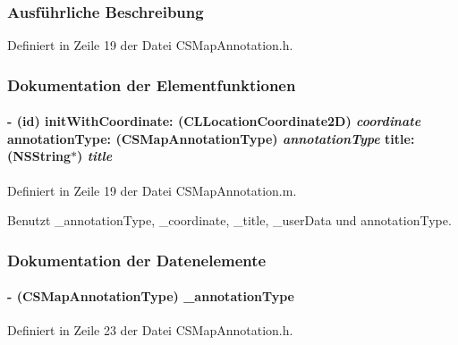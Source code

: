 \subsubsection{Ausführliche Beschreibung}


Definiert in Zeile 19 der Datei CSMapAnnotation.h.

\subsubsection{Dokumentation der Elementfunktionen}
\hypertarget{interface_c_s_map_annotation_a59239c83c34dd66add7bbc27492d636c}{
\paragraph[{initWithCoordinate:annotationType:title:}]{\setlength{\rightskip}{0pt plus 5cm}-\/ (id) initWithCoordinate: (CLLocationCoordinate2D) {\em coordinate}\/ annotationType: ({\bf CSMapAnnotationType}) {\em annotationType}\/ title: (NSString$\ast$) {\em title}}\hfill}
\label{interface_c_s_map_annotation_a59239c83c34dd66add7bbc27492d636c}


Definiert in Zeile 19 der Datei CSMapAnnotation.m.

Benutzt \_\-annotationType, \_\-coordinate, \_\-title, \_\-userData und annotationType.

\subsubsection{Dokumentation der Datenelemente}
\hypertarget{interface_c_s_map_annotation_a6c62bc91ec129a0eccdd33b67132a6ba}{
\paragraph[{\_\-annotationType}]{\setlength{\rightskip}{0pt plus 5cm}-\/ ({\bf CSMapAnnotationType}) {\bf \_\-annotationType}}\hfill}
\label{interface_c_s_map_annotation_a6c62bc91ec129a0eccdd33b67132a6ba}


Definiert in Zeile 23 der Datei CSMapAnnotation.h.

